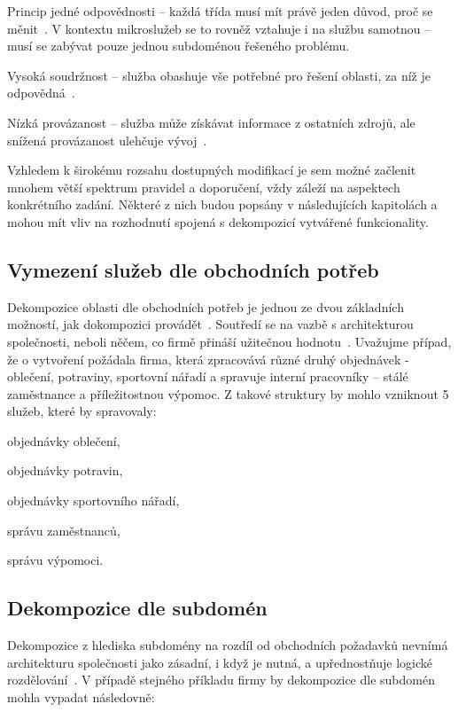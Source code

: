 \begin{dl}
   \item[Princip jedné odpovědnosti] – každá třída musí mít právě jeden důvod, proč se měnit~\cite{srp}.
   V kontextu mikroslužeb se to rovněž vztahuje i na službu samotnou – musí se zabývat pouze jednou subdoménou řešeného problému.
   \item[Vysoká soudržnost] – služba obashuje vše potřebné pro řešení oblasti, za níž je odpovědná~\cite{lchc}.
   \item[Nízká provázanost] – služba může získávat informace z ostatních zdrojů, ale snížená provázanost ulehčuje vývoj~\cite{lchc}.
\end{dl}


Vzhledem k širokému rozsahu dostupných modifikací  je sem možné začlenit mnohem větší spektrum pravidel a doporučení, vždy záleží na aspektech konkrétního zadání.
Některé z nich budou popsány v následujících kapitolách a mohou mít vliv na rozhodnutí spojená s dekompozicí vytvářené funkcionality.



\subsection{Vymezení služeb dle obchodních potřeb}\label{subsec:msa-decomposition-business}
Dekompozice oblasti dle obchodních potřeb je jednou ze dvou základních možností, jak dokompozici provádět~\cite{msachris}.
Soutředí se na vazbě s architekturou společnosti, neboli něčem, co firmě přináší užitečnou hodnotu~\cite{decompbusiness}.
Uvažujme případ, že o vytvoření  požádala firma, která zpracovává různé druhý objednávek - oblečení, potraviny, sportovní nářadí a spravuje interní pracovníky – stálé zaměstnance a příležitostnou výpomoc.
Z takové struktury by mohlo vzniknout 5 služeb, které by spravovaly:


\begin{ul}
   \item objednávky oblečení,
   \item objednávky potravin,
   \item objednávky sportovního nářadí,
   \item správu zaměstnanců,
   \item správu výpomoci.
\end{ul}



\subsection{Dekompozice dle subdomén}\label{subsec:msa-decomposition-domain}
Dekompozice z hlediska subdomény na rozdíl od obchodních požadavků nevnímá architekturu společnosti jako zásadní, i když je nutná, a upřednostňuje logické rozdělování~\cite{decompsubdomain}.
V případě stejného příkladu firmy by dekompozice dle subdomén mohla vypadat následovně:


